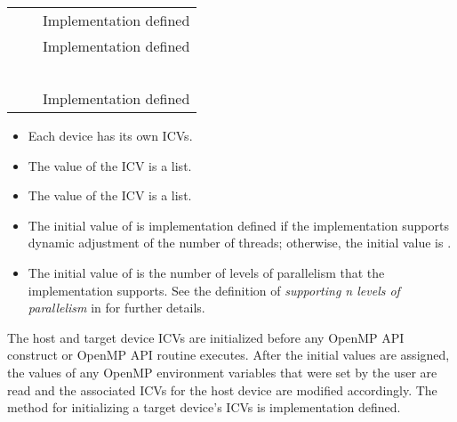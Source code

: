 \begin{supertabular}{p{1.4in} p{1.8in} p{1.5in}}
{} & {} & Implementation defined \\
{} & {} & Implementation defined\\
{} & {} & {} \\
{} & {} & {}\\
{} & {} & {}\\
{} & {} & {}\\
{} & {} & {} \\
{} & {} & Implementation defined\\
\end{supertabular}

\linenumbers

\descr
\begin{itemize}
\item Each device has its own ICVs.

\item The value of the  ICV is a list.

\item The value of the  ICV is a list.

\item The initial value of  is implementation defined if the implementation supports
dynamic adjustment of the number of threads; otherwise, the initial value is .

\item The initial value of  is the number of levels of parallelism that
the implementation supports. See the definition of \emph{supporting n levels of parallelism}
in  for further details.
\end{itemize}

The host and target device ICVs are initialized before any OpenMP API construct or
OpenMP API routine executes. After the initial values are assigned, the values of any
OpenMP environment variables that were set by the user are read and the associated
ICVs for the host device are modified accordingly. The method for initializing a target
device's ICVs is implementation defined.

